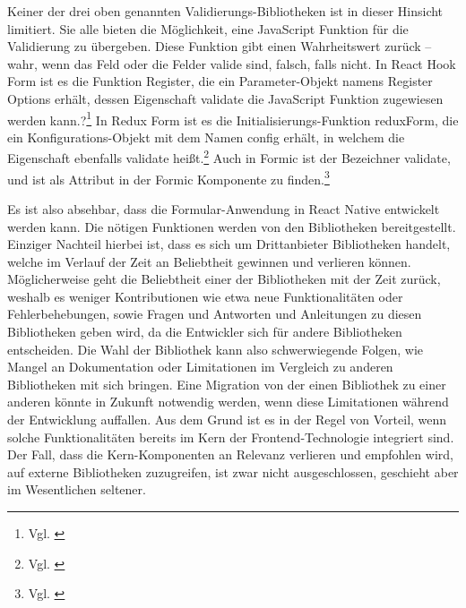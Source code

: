 Keiner der drei oben genannten Validierungs-Bibliotheken ist in dieser Hinsicht limitiert.
Sie alle bieten die Möglichkeit, eine JavaScript Funktion für die Validierung zu übergeben.
Diese Funktion gibt einen Wahrheitswert zurück – wahr, wenn das Feld oder die Felder valide sind, falsch, falls nicht.
In React Hook Form ist es die Funktion Register, die ein Parameter-Objekt namens Register Options erhält, dessen Eigenschaft validate die JavaScript Funktion zugewiesen werden kann.?\footnote{Vgl. \cite{RegisterReactHookFormAPI}}
In Redux Form ist es die Initialisierungs-Funktion reduxForm, die ein Konfigurations-Objekt mit dem Namen config erhält, in welchem die Eigenschaft ebenfalls validate heißt.\footnote{Vgl. \cite{ReduxFormReduxFormAPI}}
Auch in Formic ist der Bezeichner validate, und ist als Attribut in der Formic Komponente  zu finden.\footnote{Vgl. \cite{FormikComponentFormikDocsAPI}}


Es ist also absehbar, dass die Formular-Anwendung in React Native entwickelt werden kann.
Die nötigen Funktionen werden von den Bibliotheken bereitgestellt.
Einziger Nachteil hierbei ist, dass es sich um Drittanbieter Bibliotheken handelt, welche im Verlauf der Zeit an Beliebtheit gewinnen und verlieren können.
Möglicherweise geht die Beliebtheit einer der Bibliotheken mit der Zeit zurück, weshalb es weniger Kontributionen wie etwa neue Funktionalitäten oder Fehlerbehebungen, sowie Fragen und Antworten und Anleitungen zu diesen Bibliotheken geben wird, da die Entwickler sich für andere Bibliotheken entscheiden.
Die Wahl der Bibliothek kann also schwerwiegende Folgen, wie Mangel an Dokumentation oder Limitationen im Vergleich zu anderen Bibliotheken mit sich bringen.
Eine Migration von der einen Bibliothek zu einer anderen könnte in Zukunft notwendig werden, wenn diese Limitationen während der Entwicklung auffallen.
Aus dem Grund ist es in der Regel von Vorteil, wenn solche Funktionalitäten bereits im Kern der Frontend-Technologie integriert sind.
Der Fall, dass die Kern-Komponenten an Relevanz verlieren und empfohlen wird, auf externe Bibliotheken zuzugreifen, ist zwar nicht ausgeschlossen, geschieht aber im Wesentlichen seltener.



















